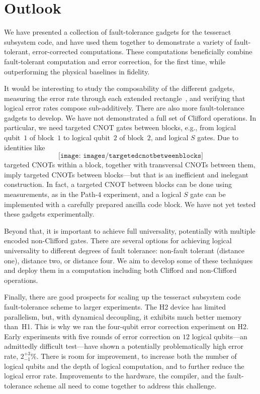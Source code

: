 \documentclass[10pt, twocolumn, aps, nofootinbib, longbibliography, nobibnotes, superscriptaddress]{revtex4-1} %
\begin{document}
\section{Outlook}

We have presented a collection of fault-tolerance gadgets for the tesseract subsystem code, and have used them together to demonstrate a variety of fault-tolerant, error-corrected computations.  These computations beneficially combine fault-tolerant computation and error correction, for the first time, while outperforming the physical baselines in fidelity.  

It would be interesting to study %
the composability of the different gadgets, measuring the error rate through each extended rectangle~\cite{AliferisGottesmanPreskill05}, and verifying that logical error rates compose sub-additively.  
There are also more fault-tolerance gadgets to develop. %
We have not %
demonstrated a full set of Clifford operations.  In particular, we need targeted CNOT gates between blocks, e.g., from logical qubit~$1$ of block~$1$ to logical qubit~$2$ of block~$2$, and logical $S$ gates.  
Due to identities like 
$$
\texttt{[image: images/targetedcnotbetweenblocks]}
$$
targeted CNOTs within a block, together with transversal CNOTs between them, imply targeted CNOTs between blocks---but that is an inefficient and inelegant construction.  
In fact, a targeted CNOT between blocks can be done using measurements, as in the Path-$4$ experiment, and a logical $S$ gate can be implemented %
with a carefully prepared ancilla code block.  We have not yet tested these gadgets experimentally.  

Beyond that, it is important to achieve full universality, potentially with multiple encoded non-Clifford gates.  There are several options for achieving logical universality to different degrees of fault tolerance: non-fault tolerant (distance one), distance two, or distance four.  We aim to develop some of these techniques and deploy them in a computation including both Clifford and non-Clifford operations.  

Finally, there are good prospects for scaling up the tesseract subsystem code fault-tolerance scheme to larger experiments.  The H2 device has limited parallelism, but, with dynamical decoupling, it exhibits much better memory than~H1.  This is why we ran the four-qubit %
error correction experiment on H2. %
Early experiments with five rounds of error correction on $12$ logical qubits---an admittedly difficult test---have shown a potentially problematically high error rate, $2^{+3}_{-1}\%$.  There is room for improvement, to increase both the number of logical qubits and the depth of logical computation, and to further reduce the logical error rate.  Improvements to the hardware, the compiler, and the fault-tolerance scheme all need to come together to address this challenge.  
\end{document}
